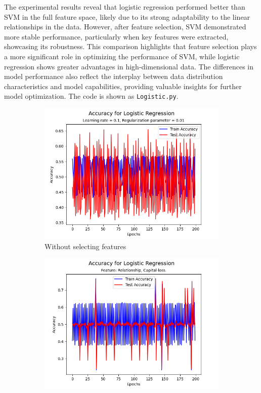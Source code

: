 \documentclass[a4paper, utf8]{ctexart}
\begin{document}
	The experimental results reveal that logistic regression performed better than SVM in the full feature space, likely due to its strong adaptability to the linear relationships in the data. However, after feature selection, SVM demonstrated more stable performance, particularly when key features were extracted, showcasing its robustness. This comparison highlights that feature selection plays a more significant role in optimizing the performance of SVM, while logistic regression shows greater advantages in high-dimensional data. The differences in model performance also reflect the interplay between data distribution characteristics and model capabilities, providing valuable insights for further model optimization. The code is shown as \verb|Logistic.py|.
	
	\begin{figure}[htbp]
		\centering
		\begin{subfigure}{.32\textwidth}
			\centering
			\includegraphics[width=.9\textwidth]{./figure/myplotL1.png}
			\caption{Without selecting features}
		\end{subfigure}
		\begin{subfigure}{.32\textwidth}
			\centering
			\includegraphics[width=.9\textwidth]{./figure/myplotL2.png}

\end{subfigure}
\end{figure}
\end{document}
